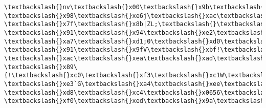 \documentclass[11pt]{article}
\begin{document}
\begin{Verbatim}[commandchars=\\\{\}]
\textbackslash{}nv\textbackslash{}x00\textbackslash{}x9b\textbackslash{}r/\textbackslash{}xa0\textbackslash{}xe1\textbackslash{}x83\textbackslash{}x15\textbackslash{}xa6\textbackslash{}x99(\textbackslash{}x9bkv\textbackslash{}x02\textbackslash{}xe0\textbackslash{}x1d(\textbackslash{}xeb\textbackslash{}xfe\textbackslash{}x0f@
\textbackslash{}x98\textbackslash{}xe6j\textbackslash{}xac\textbackslash{}x8aQ\textbackslash{}xdb\textbackslash{}xac\textbackslash{}x944\textbackslash{}xc4\textbackslash{}xaf\textbackslash{}x00t\textbackslash{}xc8U\textbackslash{}xef\textbackslash{}xb4\textbackslash{}xee\textbackslash{}x872\^{}
\textbackslash{}x7f\textbackslash{}x8b|ZL;\textbackslash{}\textbackslash{}kD\textbackslash{}xc19\textbackslash{}xd2f\textbackslash{}xe6\textbackslash{}xeaz\textbackslash{}xfd\textbackslash{}n\textbackslash{}r\textbackslash{}x9a\textbackslash{}x17GD\textbackslash{}x8d\textbackslash{}xda\textbackslash{}xd3\textbackslash{}xabC\textbackslash{}xa7\$
\textbackslash{}x91\textbackslash{}x94\textbackslash{}xe2\textbackslash{}x0eS\textbackslash{}xae\textbackslash{}x99V":c\textbackslash{}xa3\textbackslash{}xce5\textbackslash{}x9f\textbackslash{}xb3]\textbackslash{}x9f\textbackslash{}x0f\textbackslash{}x15\textbackslash{}x00c\textbackslash{}xab\textbackslash{}x12\textbackslash{}x14
\textbackslash{}xa7\textbackslash{}xd1;0\textbackslash{}xd0\textbackslash{}xc2\textbackslash{}x0b\textbackslash{}xbf\textbackslash{}x8a7\textbackslash{}x94J\textbackslash{}x8e\textbackslash{}xbf\textbackslash{}xb1\textbackslash{}xbc\textbackslash{}x01\textbackslash{}x99\textbackslash{}xe6\textbackslash{}xfc\textbackslash{}xc8
\textbackslash{}x91\textbackslash{}x9fV\textbackslash{}xbf!\textbackslash{}xaa \textbackslash{}xac\textbackslash{}xea\textbackslash{}xad\textbackslash{}x0b\textbackslash{}xca\textbackslash{}xa8\textbackslash{}xd0\textbackslash{}xafTY)\textbackslash{}xed@\textbackslash{}x1c\textbackslash{}xaf\textbackslash{}xd9
\textbackslash{}x89\{!\textbackslash{}xc0\textbackslash{}xf3\textbackslash{}xc1W\textbackslash{}xf7\textbackslash{}x02\textbackslash{}xec\textbackslash{}xd3\textbackslash{}x81\textbackslash{}x81\textbackslash{}x03ijO\textbackslash{}xe8\textbackslash{}xb3\textbackslash{}x1d.B\textbackslash{}x84\textbackslash{}r\textbackslash{}x934b
\textbackslash{}xe3`G\textbackslash{}xa4\textbackslash{}xee\textbackslash{}xfd\textbackslash{}xfa\textbackslash{}xa6\textbackslash{}xa3c\textbackslash{}xe7\textbackslash{}xacK-\textbackslash{}xd8\textbackslash{}xc4\textbackslash{}x0656\textbackslash{}xbc\textbackslash{}xaaM\textbackslash{}xc1\textbackslash{}x82F\textbackslash{}x15
\textbackslash{}xf0\textbackslash{}xed\textbackslash{}x9a\textbackslash{}xbbc\textbackslash{}xbd@\textbackslash{}x86\textbackslash{}x91S\textbackslash{}xd0\textbackslash{}x94=\textbackslash{}xec\textbackslash{}xb7uRM\textbackslash{}x01\textbackslash{}xa7\textbackslash{}xccg\textbackslash{}xdf\textbackslash{}x08\textbackslash{}xe8\textbackslash{}xff
    \end{Verbatim}
\end{document}
